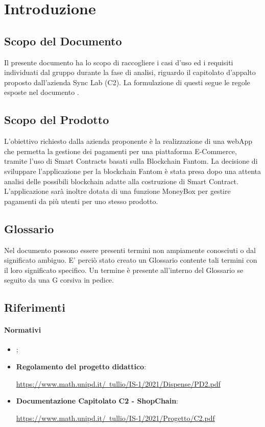 \section{Introduzione} \label{section:introduzione}

\subsection{Scopo del Documento}
Il presente documento ha lo scopo di raccogliere i casi d'uso ed i requisiti individuati dal gruppo
durante la fase di analisi, riguardo il capitolato d'appalto proposto dall'azienda Sync Lab (C2). La formulazione di questi segue le regole esposte nel documento \docNameNdP{}.

\subsection{Scopo del Prodotto}
L'obiettivo richiesto dalla azienda proponente è la realizzazione di una webApp\glo{} che permetta la gestione dei pagamenti per una piattaforma E-Commerce, tramite l'uso di Smart Contracts\glo{} basati sulla Blockchain\glo{} Fantom\glo{}.
La decisione di sviluppare l'applicazione per la blockchain Fantom è stata presa dopo una attenta analisi delle possibili blockchain adatte alla costruzione di Smart Contract.
L'applicazione sarà inoltre dotata di una funzione MoneyBox\glo{} per gestire pagamenti da più utenti per uno stesso prodotto.

\subsection{Glossario}
Nel documento possono essere presenti termini non ampiamente conosciuti o dal significato ambiguo. E' perciò stato creato
un Glossario contente tali termini con il loro significato specifico. Un termine è presente
all'interno del Glossario se seguito da una G corsiva in pedice.

\subsection{Riferimenti}

\paragraph{Normativi}
\begin{itemize}
    \item \textbf{\docNameVersionNdP{}};
    \item \textbf{Regolamento del progetto didattico}:
    \begin{center}
        \href{https://www.math.unipd.it/~tullio/IS-1/2021/Dispense/PD2.pdf}{https://www.math.unipd.it/~tullio/IS-1/2021/Dispense/PD2.pdf}
    \end{center}
    \item \textbf{Documentazione Capitolato C2 - ShopChain}:
    \begin{center}
        \href{https://www.math.unipd.it/~tullio/IS-1/2021/Progetto/C2.pdf}{https://www.math.unipd.it/~tullio/IS-1/2021/Progetto/C2.pdf}
    \end{center}
\end{itemize}

